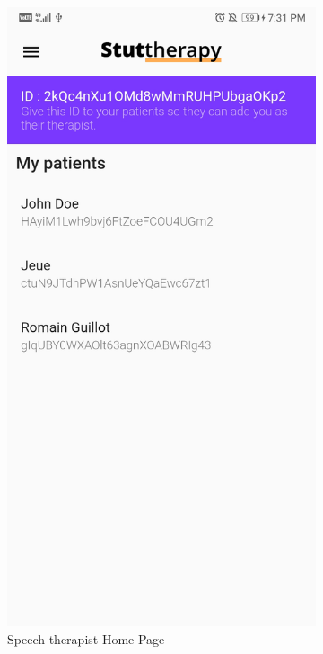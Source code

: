 \begin{appendices}
\begin{landscape}
\begin{figure}[h]
\begin{subfigure}{.25\textwidth}
    \includegraphics[width=.75\linewidth]{content/imgs/screen14.jpg}
    \caption{Speech therapist Home Page}
  \end{subfigure}%
  \begin{subfigure}{.25\textwidth}
    \centering

\end{subfigure}
\end{figure}
\end{landscape}
\end{appendices}
